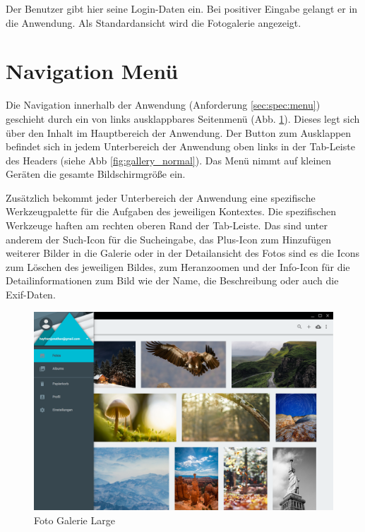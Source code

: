 Der Benutzer gibt hier seine Login-Daten ein. Bei positiver Eingabe gelangt er in die Anwendung. Als Standardansicht wird die Fotogalerie angezeigt.

\section{Navigation Menü}
\label{sec:des:navigation_menu}

Die Navigation innerhalb der Anwendung (Anforderung \ref{sec:spec:menu}) geschieht durch ein von links ausklappbares Seitenmenü (Abb. \ref{fig:gallery_large}). Dieses legt sich über den Inhalt im Hauptbereich der Anwendung. Der Button zum Ausklappen befindet sich in jedem Unterbereich der Anwendung oben links in der Tab-Leiste des Headers (siehe Abb \ref{fig:gallery_normal}). Das Menü nimmt auf kleinen Geräten die gesamte Bildschirmgröße ein.

Zusätzlich bekommt jeder Unterbereich der Anwendung eine spezifische Werkzeugpalette für die Aufgaben des jeweiligen Kontextes. Die spezifischen Werkzeuge haften am rechten oberen Rand der Tab-Leiste. Das sind unter anderem der Such-Icon für die Sucheingabe, das Plus-Icon zum Hinzufügen weiterer Bilder in die Galerie oder in der Detailansicht des Fotos sind es die Icons zum Löschen des jeweiligen Bildes, zum Heranzoomen und der Info-Icon für die Detailinformationen zum Bild wie der Name, die Beschreibung oder auch die Exif-Daten.

\begin{figure}[htp]     %
\centering
\includegraphics[width=1.0\textwidth]{images/gallery_large}
\caption{Foto Galerie Large}\label{fig:gallery_large}
\end{figure}

